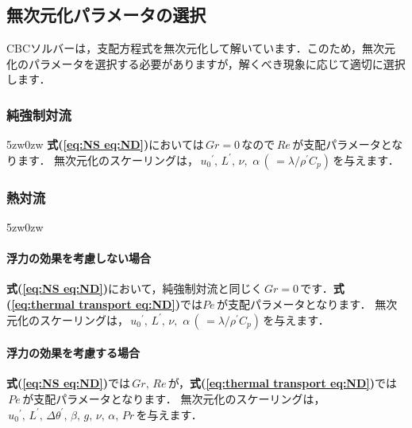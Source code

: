 \subsection{無次元化パラメータの選択}
CBCソルバーは，支配方程式を無次元化して解いています．このため，無次元化のパラメータを選択する必要がありますが，解くべき現象に応じて適切に選択します．


\subsubsection{純強制対流}
\begin{indentation}{5zw}{0zw}
\noindent \textbf{式(\ref{eq:NS eq:ND})}においては$\,Gr=0\,$なので$\,Re\,$が支配パラメータとなります．
無次元化のスケーリングは，$\,{u_{0}}^{\prime},\,L^{\prime},\,\nu,\,\,\alpha\,(\,=\lambda / \rho^{\prime} C_{p})\,$を与えます．\\

\end{indentation}

\subsubsection{熱対流}
\begin{indentation}{5zw}{0zw}
\paragraph{浮力の効果を考慮しない場合}
\noindent \textbf{式(\ref{eq:NS eq:ND})}において，純強制対流と同じく$\,Gr=0\,$です．\textbf{式(\ref{eq:thermal transport eq:ND})}では$Pe\,$が支配パラメータとなります．
無次元化のスケーリングは，$\,{u_{0}}^{\prime},\,L^{\prime},\,\nu,\,\,\alpha\,(\,=\lambda / \rho^{\prime} C_{p})\,$を与えます．\\
\paragraph{浮力の効果を考慮する場合}
\textbf{式(\ref{eq:NS eq:ND})}では$\,Gr,\,Re\,$が，\textbf{式(\ref{eq:thermal transport eq:ND})}では$\,Pe\,$が支配パラメータとなります．
無次元化のスケーリングは，$\,{u_{0}}^{\prime},\,L^{\prime},\,\Delta\theta^{\prime},\,\beta,\,g,\,\nu,\,\alpha,\,Pr\,$を与えます．\\
\end{indentation}

